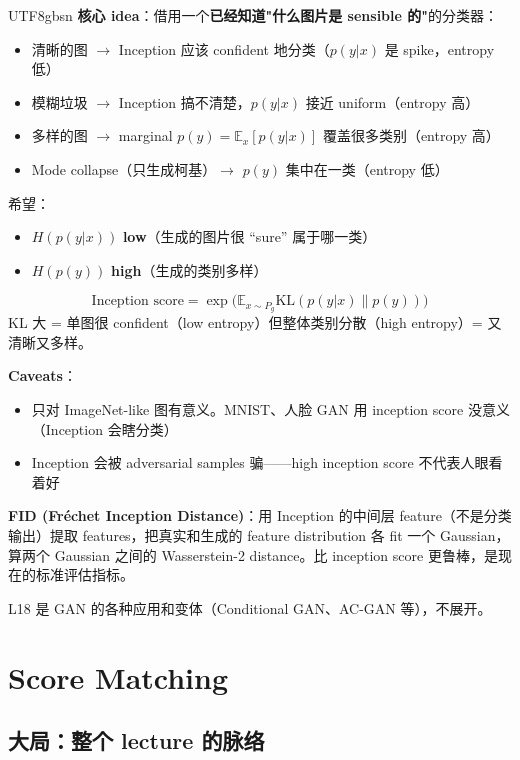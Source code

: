 \documentclass[11pt]{article}
\begin{document}
\begin{CJK}{UTF8}{gbsn}
\textbf{核心 idea}：借用一个\textbf{已经知道"什么图片是 sensible 的"}的分类器：
\begin{itemize}[nosep]
  \item 清晰的图 $\to$ Inception 应该 confident 地分类（$p(y|x)$ 是 spike，entropy 低）
  \item 模糊垃圾 $\to$ Inception 搞不清楚，$p(y|x)$ 接近 uniform（entropy 高）
  \item 多样的图 $\to$ marginal $p(y) = \mathbb{E}_x[p(y|x)]$ 覆盖很多类别（entropy 高）
  \item Mode collapse（只生成柯基）$\to$ $p(y)$ 集中在一类（entropy 低）
\end{itemize}

希望：
\begin{itemize}[nosep]
  \item $H(p(y|x))$ \textbf{low}（生成的图片很 ``sure'' 属于哪一类）
  \item $H(p(y))$ \textbf{high}（生成的类别多样）
\end{itemize}
\[
  \text{Inception score} = \exp\!\big(\mathbb{E}_{x \sim P_g} \mathrm{KL}(p(y|x) \| p(y))\big)
\]
KL 大 = 单图很 confident（low entropy）但整体类别分散（high entropy）= 又清晰又多样。

\textbf{Caveats}：
\begin{itemize}[nosep]
  \item 只对 ImageNet-like 图有意义。MNIST、人脸 GAN 用 inception score 没意义（Inception 会瞎分类）
  \item Inception 会被 adversarial samples 骗——high inception score 不代表人眼看着好
\end{itemize}

\textbf{FID (Fréchet Inception Distance)}：用 Inception 的中间层 feature（不是分类输出）提取 features，把真实和生成的 feature distribution 各 fit 一个 Gaussian，算两个 Gaussian 之间的 Wasserstein-2 distance。比 inception score 更鲁棒，是现在的标准评估指标。

L18 是 GAN 的各种应用和变体（Conditional GAN、AC-GAN 等），不展开。

\section{Score Matching}

\subsection{大局：整个 lecture 的脉络}


\end{CJK}
\end{document}
